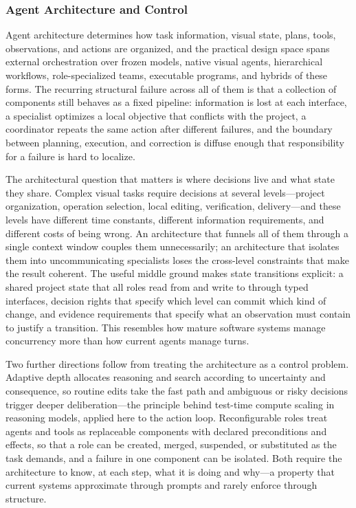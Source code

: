 \subsubsection{Agent Architecture and Control}

Agent architecture determines how task information, visual state, plans, tools, observations, and actions are organized, and the practical design space spans external orchestration over frozen models, native visual agents, hierarchical workflows, role-specialized teams, executable programs, and hybrids of these forms. The recurring structural failure across all of them is that a collection of components still behaves as a fixed pipeline: information is lost at each interface, a specialist optimizes a local objective that conflicts with the project, a coordinator repeats the same action after different failures, and the boundary between planning, execution, and correction is diffuse enough that responsibility for a failure is hard to localize.

The architectural question that matters is where decisions live and what state they share. Complex visual tasks require decisions at several levels---project organization, operation selection, local editing, verification, delivery---and these levels have different time constants, different information requirements, and different costs of being wrong. An architecture that funnels all of them through a single context window couples them unnecessarily; an architecture that isolates them into uncommunicating specialists loses the cross-level constraints that make the result coherent. The useful middle ground makes state transitions explicit: a shared project state that all roles read from and write to through typed interfaces, decision rights that specify which level can commit which kind of change, and evidence requirements that specify what an observation must contain to justify a transition. This resembles how mature software systems manage concurrency more than how current agents manage turns.

Two further directions follow from treating the architecture as a control problem. Adaptive depth allocates reasoning and search according to uncertainty and consequence, so routine edits take the fast path and ambiguous or risky decisions trigger deeper deliberation---the principle behind test-time compute scaling in reasoning models, applied here to the action loop. Reconfigurable roles treat agents and tools as replaceable components with declared preconditions and effects, so that a role can be created, merged, suspended, or substituted as the task demands, and a failure in one component can be isolated. Both require the architecture to know, at each step, what it is doing and why---a property that current systems approximate through prompts and rarely enforce through structure.

